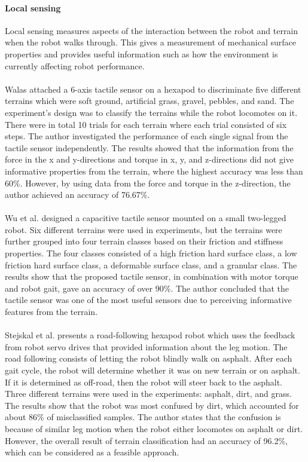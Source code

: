 \documentclass[USenglish]{ifimaster}  %
\begin{document}
\paragraph{Local sensing}
Local sensing measures aspects of the interaction between the robot and terrain when the robot walks through. This gives a measurement of mechanical surface properties and provides useful information such as how the environment is currently affecting robot performance. 
\\
\\
Walas \cite{walastactile} attached a 6-axis tactile sensor on a hexapod to discriminate five different terrains which were soft ground, artificial grass, gravel, pebbles, and sand. The experiment's design was to classify the terrains while the robot locomotes on it. There were in total 10 trials for each terrain where each trial consisted of six steps. The author investigated the performance of each single signal from the tactile sensor independently. The results showed that the information from the force in the x and y-directions and torque in x, y, and z-directions did not give informative properties from the terrain, where the highest accuracy was less than 60\%. However, by using data from the force and torque in the z-direction, the author achieved an accuracy of 76.67\%.
\\
\\
Wu et al. \cite{7397881} designed a capacitive tactile sensor mounted on a small two-legged robot. Six different terrains were used in experiments, but the terrains were further grouped into four terrain classes based on their friction and stiffness properties. The four classes consisted of a high friction hard surface class,  a low friction hard surface class, a deformable surface class, and a granular class. The results show that the proposed tactile sensor, in combination with motor torque and robot gait, gave an accuracy of over 90\%. The author concluded that the tactile sensor was one of the most useful sensors due to perceiving informative features from the terrain.
\\
\\ 
Stejskal et al. \cite{7487544} presents a road-following hexapod robot which uses the feedback from robot servo drives that provided information about the leg motion. The road following consists of letting the robot blindly walk on asphalt. After each gait cycle, the robot will determine whether it was on new terrain or on asphalt. If it is determined as off-road, then the robot will steer back to the asphalt. Three different terrains were used in the experiments: asphalt, dirt, and grass. The results show that the robot was most confused by dirt, which accounted for about 86\% of misclassified samples. The author states that the confusion is because of similar leg motion when the robot either locomotes on asphalt or dirt. However, the overall result of terrain classification had an accuracy of 96.2\%, which can be considered as a feasible approach.
\end{document}

